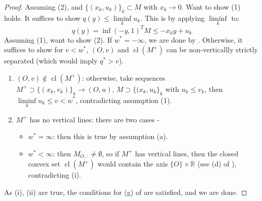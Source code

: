 \begin{proof}
	Assuming (2), and $\{(x_k,u_k)\}_{k}\subset M$ with $x_k\to 0$. Want to show (1) holds. It suffices to show $q(y)\leq \underset{k}{\operatorname{liminf}}u_k$. This is by applying $\underset{k}{\operatorname{liminf}}$ to:
	\[
		q(y)=\inf (-y,1)^TM \leq -x_ky+u_k
	\]
	Assuming (1), want to show (2). If $w^\ast=-\infty$, we are done by . Otherwise, it suffices to show for $v<w^\ast$, $(O,v)$ and $\operatorname{cl}(M^+)$ can be non-verticallly strictly separated (which would imply $q^\ast >v$).
	\begin{enumerate}[label=(\roman*)]
		\item $(O,v)\notin \operatorname{cl}(M^+)$: otherwise, take sequences $M^+\supset\{(x_k,v_k)\}_{k}\to (O,u)$, $M\supset \{(x_k,u_k\}_{k}$ with $u_k\leq v_k$, then $\underset{k}{\operatorname{liminf}}u_k\leq v<w^\ast$, contradicting assumption (1).
		\item $M^+$ has no vertical lines: there are two cases -
		      \begin{itemize}
			      \item $w^\ast=\infty$: then this is true by assumption (a).
			      \item $w^\ast<\infty$: then $M_{O,:}\neq\emptyset$, so if $M^+$ has vertical lines, then the closed convex set $\operatorname{cl}(M^+)$ would contain the axis $\{O\}\times \mathbb{R}$ (see (d) of ), contradicting (i).
		      \end{itemize}
	\end{enumerate}
	As (i), (ii) are true, the conditions for (g) of  are satisfied, and we are done.
\end{proof}

